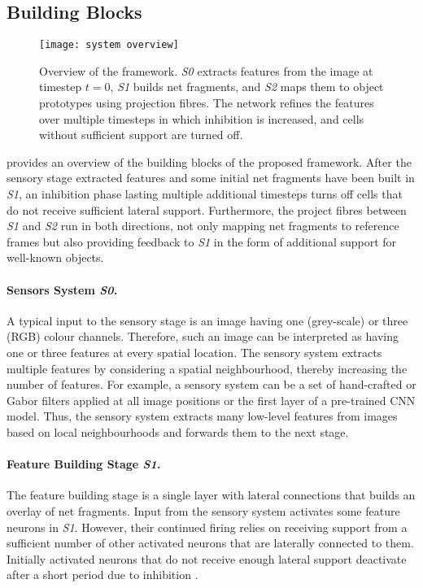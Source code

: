 \subsection{Building Blocks}
\begin{figure}[h]
    \centering
    \texttt{[image: system overview]}
    \caption[Overview of the framework]{Overview of the framework. \emph{S0} extracts features from the image at timestep $t=0$, \emph{S1} builds net fragments, and \emph{S2} maps them to object prototypes using projection fibres. The network refines the features over multiple timesteps in which inhibition is increased, and cells without sufficient support are turned off.}
\end{figure}

 provides an overview of the building blocks of the proposed framework. After the sensory stage extracted features and some initial net fragments have been built in \emph{S1}, an inhibition phase lasting multiple additional timesteps turns off cells that do not receive sufficient lateral support. Furthermore, the project fibres between \emph{S1} and \emph{S2} run in both directions, not only mapping net fragments to reference frames but also providing feedback to \emph{S1} in the form of additional support for well-known objects.

\paragraph{Sensors System \emph{S0}.} A typical input to the sensory stage is an image having one (grey-scale) or three (RGB) colour channels. Therefore, such an image can be interpreted as having one or three features at every spatial location.
The sensory system extracts multiple features by considering a spatial neighbourhood, thereby increasing the number of features.
For example, a sensory system can be a set of hand-crafted or Gabor filters applied at all image positions or the first layer of a pre-trained CNN model.
Thus, the sensory system extracts many low-level features from images based on local neighbourhoods and forwards them to the next stage.

\paragraph{Feature Building Stage \emph{S1}.} The feature building stage is a single layer with lateral connections  that builds an overlay of net fragments. Input from the sensory system activates some feature neurons in \emph{S1}. However, their continued firing relies on receiving support from a sufficient number of other activated neurons that are laterally connected to them. Initially activated neurons that do not receive enough lateral support deactivate after a short period due to inhibition .

